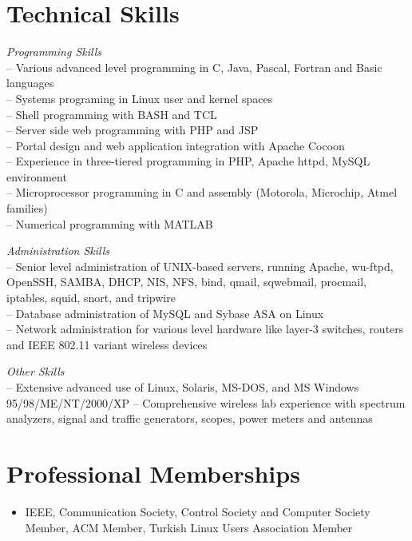 \documentclass[10pt]{article}
\begin{document}
\section{Technical Skills}
\begin{CV}
\item[\emph{Programming Skills} ]\ \\
-- Various advanced level programming in C, Java, Pascal, Fortran and Basic
languages\\
-- Systems programing in Linux user and kernel spaces\\
-- Shell programming with BASH and TCL\\
-- Server side web programming with PHP and JSP\\
-- Portal design and web application integration with Apache Cocoon\\
-- Experience in three-tiered programming in PHP, Apache httpd, MySQL environment\\
-- Microprocessor programming in C and assembly (Motorola, Microchip, Atmel families)\\
-- Numerical programming with MATLAB\\

\item[\emph{Administration Skills} ]\ \\
-- Senior level administration of UNIX-based servers, running
Apache, wu-ftpd, OpenSSH, SAMBA, DHCP, NIS, NFS, bind, qmail,
sqwebmail, procmail, iptables, squid, snort, and tripwire\\
-- Database administration of MySQL and Sybase ASA on Linux\\
-- Network administration for various level hardware like layer-3
switches, routers and IEEE 802.11 variant wireless devices

\item[\emph{Other Skills} ]\ \\
-- Extensive advanced use of Linux, Solaris, MS-DOS, and MS Windows 95/98/ME/NT/2000/XP
-- Comprehensive wireless lab experience with spectrum analyzers, signal and traffic generators, scopes, power meters and antennas   
\end{CV}


\section{Professional Memberships}
\begin{itemize}
\item IEEE, Communication Society, Control Society and Computer Society
Member, ACM Member, Turkish Linux Users Association Member
\end{itemize}
\end{document}
